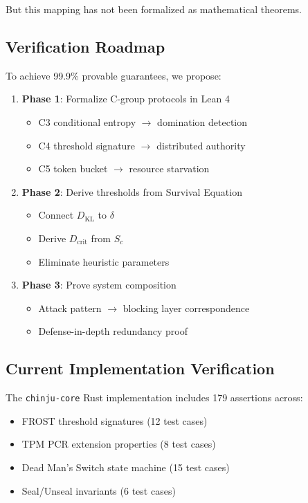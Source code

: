 \documentclass[11pt,a4paper]{article}
\newcommand{\DKL}{D_{\text{KL}}}
\begin{document}
But this mapping has not been formalized as mathematical theorems.

\subsection{Verification Roadmap}

To achieve 99.9\% provable guarantees, we propose:

\begin{enumerate}
    \item \textbf{Phase 1}: Formalize C-group protocols in Lean 4
    \begin{itemize}
        \item C3 conditional entropy $\to$ domination detection
        \item C4 threshold signature $\to$ distributed authority
        \item C5 token bucket $\to$ resource starvation
    \end{itemize}

    \item \textbf{Phase 2}: Derive thresholds from Survival Equation
    \begin{itemize}
        \item Connect $\DKL$ to $\delta$
        \item Derive $D_{\text{crit}}$ from $S_c$
        \item Eliminate heuristic parameters
    \end{itemize}

    \item \textbf{Phase 3}: Prove system composition
    \begin{itemize}
        \item Attack pattern $\to$ blocking layer correspondence
        \item Defense-in-depth redundancy proof
    \end{itemize}
\end{enumerate}

\subsection{Current Implementation Verification}

The \texttt{chinju-core} Rust implementation includes 179 assertions across:

\begin{itemize}
    \item FROST threshold signatures (12 test cases)
    \item TPM PCR extension properties (8 test cases)
    \item Dead Man's Switch state machine (15 test cases)
    \item Seal/Unseal invariants (6 test cases)
\end{itemize}
\end{document}
